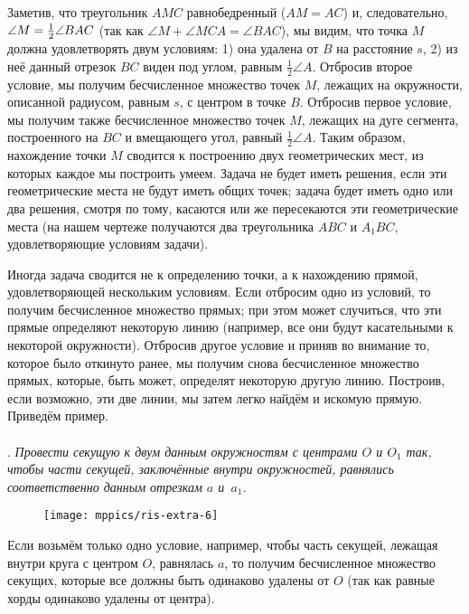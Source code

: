 Заметив, что треугольник $AMC$ равнобедренный ($AM=AC$) и, следовательно, $\angle M \z=  \tfrac12\angle BAC$ (так как $\angle M+\angle MCA = \angle BAC$), мы видим, что точка $M$ должна удовлетворять двум условиям:
1) она удалена от $B$ на расстояние $s$, 
2) из неё данный отрезок $BC$ виден под углом, равным $\tfrac12\angle A$.
Отбросив второе условие, мы получим бесчисленное множество точек $M$, лежащих на окружности, описанной радиусом, равным $s$, с центром в точке $B$.
Отбросив первое условие, мы получим также бесчисленное множество точек $M$, лежащих на дуге сегмента, построенного на $BC$ и вмещающего угол, равный $\tfrac12\angle A$.
Таким образом, нахождение точки $M$ сводится к построению двух геометрических мест, из которых каждое мы построить умеем.
Задача не будет иметь решения, если эти геометрические места не будут иметь общих точек;
задача будет иметь одно или два решения, смотря по тому, касаются или же пересекаются эти геометрические места (на нашем чертеже получаются два треугольника $ABC$ и $A_1BC$, удовлетворяющие условиям задачи).

\medskip

Иногда задача сводится не к определению точки, а к нахождению прямой, удовлетворяющей нескольким условиям.
Если отбросим одно из условий, то получим бесчисленное множество прямых;
при этом может случиться, что эти прямые определяют некоторую линию (например, все они будут касательными к некоторой окружности).
Отбросив другое условие и приняв во внимание то, которое было откинуто ранее, мы получим снова бесчисленное множество прямых, которые, быть может, определят некоторую другую линию.
Построив, если возможно, эти две линии, мы затем легко найдём и искомую прямую.
Приведём пример.

\paragraph{}\label{1938/135}
.
\emph{Провести секущую к двум данным окружностям с центрами $O$ и $O_1$ так, чтобы части секущей, заключённые внутри окружностей, равнялись соответственно данным отрезкам $a$ и~$a_1$.}

\begin{wrapfigure}{o}{53mm}
\vskip-2mm
\centering
\texttt{[image: mppics/ris-extra-6]}
\caption{}\label{extra/ris-6}
\end{wrapfigure}

Если возьмём только одно условие, например, чтобы часть секущей, лежащая внутри круга  с центром $O$, равнялась $a$, то получим бесчисленное множество секущих, которые все должны быть одинаково удалены от $O$ (так как равные хорды одинаково удалены от центра).

